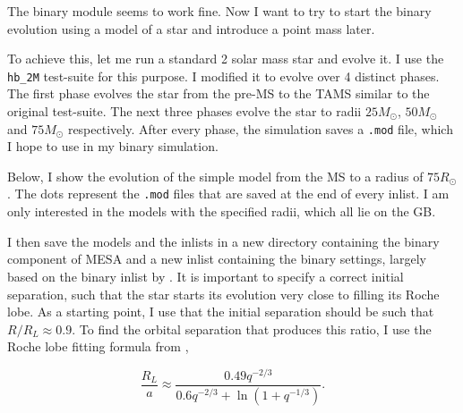 \documentclass[a4paper,10pt]{article}
\begin{document}
    \begin{figure}[ht]
        \centering
    \end{figure}
    
    The binary module seems to work fine. Now I want to try to start the binary evolution using a model of a star and introduce a point mass later.

    To achieve this, let me run a standard 2 solar mass star and evolve it. I use the \lstinline[style=output, breaklines=true]|hb_2M| test-suite for this purpose. I modified it to evolve over 4 distinct phases. The first phase evolves the star from the pre-MS to the TAMS similar to the original test-suite. The next three phases evolve the star to radii \(25M_\odot \), \(50M_\odot \) and \(75M_\odot \) respectively.
    After every phase, the simulation saves a \lstinline[style=output, breaklines=true]|.mod| file, which I hope to use in my binary simulation.

    Below, I show the evolution of the simple model from the MS to a radius of \(75R_\odot \). The dots represent the \lstinline[style=output, breaklines=true]|.mod| files that are saved at the end of every inlist. I am only interested in the models with the specified radii, which all lie on the GB.
    \begin{figure}[ht]
        \centering
    \end{figure}

    I then save the models and the inlists in a new directory containing the binary component of MESA and a new inlist containing the binary settings, largely based on the binary inlist by \citet{temmink2022}. It is important to specify a correct initial separation, such that the star starts its evolution very close to filling its Roche lobe. As a starting point, I use that the initial separation should be such that \(R / R_{L} \approx 0.9\). To find the orbital separation that produces this ratio, I use the Roche lobe fitting formula from \citet{eggleton1983},

    \begin{equation*}
        \frac{R_{L}}{a} \approx \frac{0.49 q^{-2 / 3} }{0.6 q^{-2 / 3} + \ln (1 + q^{-1 / 3} ) } .
    \end{equation*}
\end{document}
